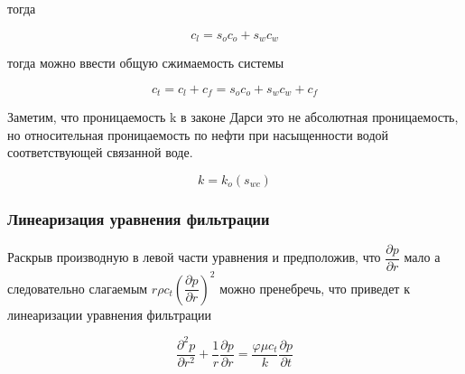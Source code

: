 тогда 

$$ c_l = s_o c_o + s_w c_w $$

тогда можно ввести общую сжимаемость системы 

$$ c_t = c_l + c_f = s_o c_o + s_w c_w  + c_f $$ 

Заметим, что проницаемость k в законе Дарси это не абсолютная проницаемость, но относительная проницаемость по нефти при насыщенности водой соответствующей связанной воде.  

$$ k= k_o (s_{wc}) $$

\subsubsection{Линеаризация уравнения фильтрации}

Раскрыв производную в левой части уравнения и предположив, что $\dfrac{\partial p}{\partial r}$ мало а следовательно слагаемым  $ r \rho c_t \left( \dfrac{\partial p}{\partial r} \right)^2 $ можно пренебречь, что приведет к линеаризации уравнения фильтрации

\begin{equation} \label{eq:diff_eq_lin}
\frac{\partial^2 p}{\partial r^2} + \frac{1}{r} \frac{\partial p}{\partial r}= \frac{\varphi \mu c_t}{k} \frac{\partial p}{\partial t}
\end{equation}

